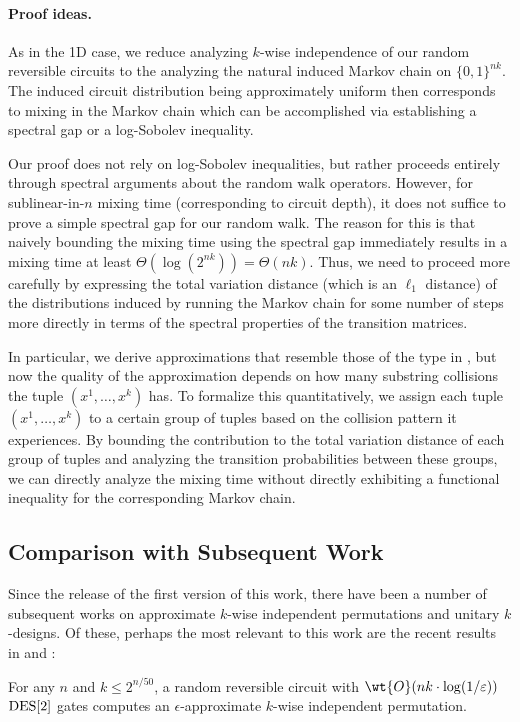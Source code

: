\paragraph{Proof ideas.} As in the 1D case, we reduce analyzing $k$-wise independence of our random reversible circuits to the analyzing the natural induced Markov chain on $\{0,1\}^{nk}$. The induced circuit distribution being approximately uniform then corresponds to mixing in the Markov chain which can be accomplished via establishing a spectral gap or a log-Sobolev inequality.

Our proof does not rely on log-Sobolev inequalities, but rather proceeds entirely through spectral arguments about the random walk operators. However, for sublinear-in-$n$ mixing time (corresponding to circuit depth), it does not suffice to prove a simple spectral gap for our random walk. The reason for this is that naively bounding the mixing time using the spectral gap immediately results in a mixing time at least $\Theta(\log(2^{nk}))=\Theta(nk)$. Thus, we need to proceed more carefully by expressing the total variation distance (which is an $\ell_1$ distance) of the distributions induced by running the Markov chain for some number of steps more directly in terms of the spectral properties of the transition matrices. 

In particular, we derive approximations that resemble those of the type in , but now the quality of the approximation depends on how many substring collisions the tuple $(x^1,\dots,x^k)$ has. To formalize this quantitatively, we assign each tuple $(x^1,\dots,x^k)$ to a certain group of tuples based on the collision pattern it experiences. By bounding the contribution to the total variation distance of each group of tuples and analyzing the transition probabilities between these groups, we can directly analyze the mixing time without directly exhibiting a functional inequality for the corresponding Markov chain.



\subsection{Comparison with Subsequent Work}\label{sec:subsequent work}
Since the release of the first version of this work, there have been a number of subsequent works on approximate $k$-wise independent permutations and unitary $k$-designs. Of these, perhaps the most relevant to this work are the recent results in \cite{gretta2024more} and \cite{chen2024incompressibility}:
\begin{theorem}\label{thm:gretta}
    For any $n$ and $k\leq 2^{n/50}$, a random reversible circuit with $\wt{O}(nk\cdot \log(1/\varepsilon))$ $\mathrm{DES}[2]$ gates computes an $\epsilon$-approximate $k$-wise independent permutation.
\end{theorem}


